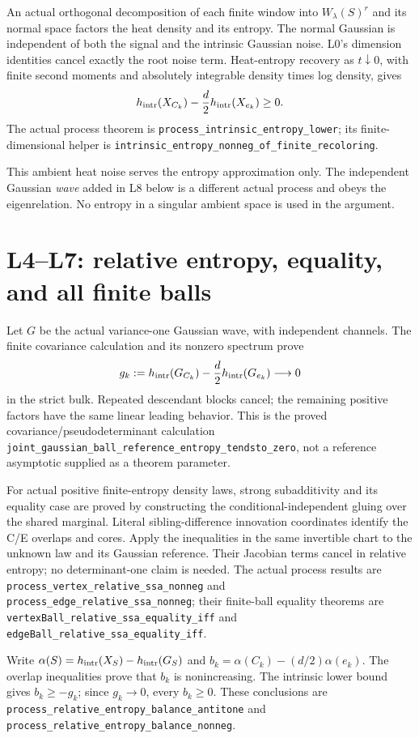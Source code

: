 \documentclass[11pt]{article}
\newcommand{\lean}[1]{{\small\nolinkurl{#1}}}
\begin{document}
An actual orthogonal decomposition of each finite window into
$W_\lambda(S)^r$ and its normal space factors the heat density and its
entropy. The normal Gaussian is independent of both the signal and the
intrinsic Gaussian noise. L0's dimension identities cancel exactly the
root noise term. Heat-entropy recovery as $t\downarrow0$, with finite second
moments and absolutely integrable density times log density, gives
\[
 h_{\rm intr}(X_{C_k})-\frac d2h_{\rm intr}(X_{e_k})\geq0.
\]
The actual process theorem is \lean{process_intrinsic_entropy_lower}; its
finite-dimensional helper is
\lean{intrinsic_entropy_nonneg_of_finite_recoloring}.

This ambient heat noise serves the entropy approximation only. The
independent Gaussian \emph{wave} added in L8 below is a different actual
process and obeys the eigenrelation. No entropy in a singular ambient
space is used in the argument.

\section{L4--L7: relative entropy, equality, and all finite balls}
Let $G$ be the actual variance-one Gaussian wave, with independent channels.
The finite covariance calculation and its nonzero spectrum prove
\[
 g_k:=h_{\rm intr}(G_{C_k})-\frac d2h_{\rm intr}(G_{e_k})\longrightarrow0
\]
in the strict bulk. Repeated descendant blocks cancel; the remaining
positive factors have the same linear leading behavior. This is the proved
covariance/pseudodeterminant calculation
\lean{joint_gaussian_ball_reference_entropy_tendsto_zero}, not a reference
asymptotic supplied as a theorem parameter.

For actual positive finite-entropy density laws, strong subadditivity and
its equality case are proved by constructing the conditional-independent
gluing over the shared marginal. Literal sibling-difference innovation
coordinates identify the C/E overlaps and cores. Apply the inequalities in
the same invertible chart to the unknown law and its Gaussian reference.
Their Jacobian terms cancel in relative entropy; no determinant-one claim
is needed. The actual process results are
\lean{process_vertex_relative_ssa_nonneg} and
\lean{process_edge_relative_ssa_nonneg}; their finite-ball equality theorems
are \lean{vertexBall_relative_ssa_equality_iff} and
\lean{edgeBall_relative_ssa_equality_iff}.

Write $\alpha(S)=h_{\rm intr}(X_S)-h_{\rm intr}(G_S)$ and
$b_k=\alpha(C_k)-(d/2)\alpha(e_k)$. The overlap inequalities prove that
$b_k$ is nonincreasing. The intrinsic lower bound gives $b_k\geq-g_k$;
since $g_k\to0$, every $b_k\geq0$. These conclusions are
\lean{process_relative_entropy_balance_antitone} and
\lean{process_relative_entropy_balance_nonneg}.
\end{document}
